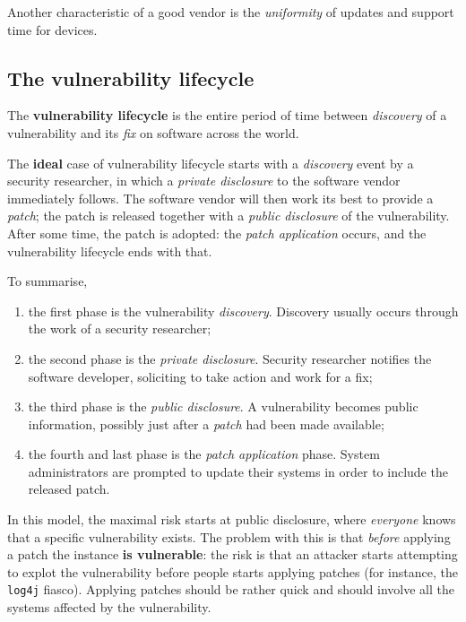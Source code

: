 \documentclass[10pt]{\classname}
\begin{document}
Another characteristic of a good vendor is the \emph{uniformity} of updates and
support time for devices.


\subsection{The vulnerability lifecycle}

The \textbf{vulnerability lifecycle} is the entire period of time between
\emph{discovery} of a vulnerability and its \emph{fix} on software across the
world.

The \textbf{ideal} case of vulnerability lifecycle starts with a
\emph{discovery} event by a security researcher, in which a \emph{private
disclosure} to the software vendor immediately follows. The software vendor
will then work its best to provide a \emph{patch}; the patch is released
together with a \emph{public disclosure} of the vulnerability. After some time,
the patch is adopted: the \emph{patch application} occurs, and the
vulnerability lifecycle ends with that.

To summarise,

\begin{enumerate}
    \item the first phase is the vulnerability \emph{discovery}. Discovery
        usually occurs through the work of a security researcher;
    \item the second phase is the \emph{private disclosure}. Security
        researcher notifies the software developer, soliciting to take action
        and work for a fix;
    \item the third phase is the \emph{public disclosure}. A vulnerability
        becomes public information, possibly just after a \emph{patch} had been
        made available;
    \item the fourth and last phase is the \emph{patch application} phase.
        System administrators are prompted to update their systems in order to
        include the released patch.
\end{enumerate}


In this model, the maximal risk starts at public disclosure, where
\emph{everyone} knows that a specific vulnerability exists. The problem with
this is that \emph{before} applying a patch the instance \textbf{is
vulnerable}: the risk is that an attacker starts attempting to explot the
vulnerability before people starts applying patches (for instance, the
\texttt{log4j} fiasco). Applying patches should be rather quick and should
involve all the systems affected by the vulnerability.
\end{document}
